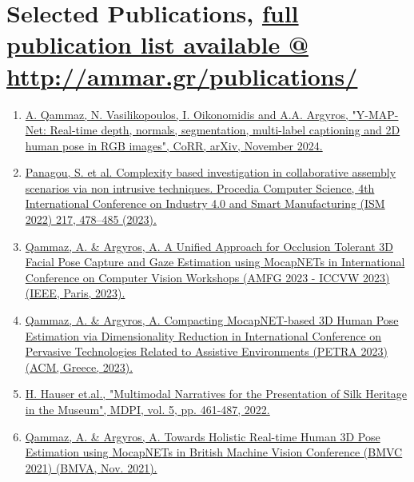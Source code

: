 \documentclass[a4,8pt]{article}
\begin{document}
\section{Selected Publications, \href{http://ammar.gr/publications/}{full publication list available @ http://ammar.gr/publications/} } 
\linespread{0.6} 
\begin{enumerate}[itemsep=-1mm]

  \item \href{http://users.ics.forth.gr/~argyros/mypapers/2024_11_arxiv_YMapNet_Qammaz.pdf}{A. Qammaz, N. Vasilikopoulos, I. Oikonomidis and A.A. Argyros, "Y-MAP-Net: Real-time depth, normals, segmentation, multi-label captioning and 2D human pose in RGB images", CoRR, arXiv, November 2024.}

  \item \href{http://users.ics.forth.gr/~argyros/mypapers/2022_11_ISM_Panagou.pdf}{Panagou, S. et al. Complexity based investigation in collaborative assembly scenarios via non intrusive techniques. Procedia Computer Science, 4th International Conference on Industry 4.0 and Smart Manufacturing (ISM 2022) 217, 478–485 (2023).}
  
  \item \href{http://users.ics.forth.gr/~argyros/mypapers/2023_10_AMFG_Qammaz.pdf}{Qammaz, A. \& Argyros, A. A Unified Approach for Occlusion Tolerant 3D Facial Pose Capture and Gaze Estimation using MocapNETs in International Conference on Computer Vision Workshops (AMFG 2023 - ICCVW 2023) (IEEE, Paris, 2023).}
  
  \item \href{http://users.ics.forth.gr/~argyros/mypapers/2023_07_PETRA_Qammaz.pdf}{Qammaz, A. \& Argyros, A. Compacting MocapNET-based 3D Human Pose Estimation via Dimensionality Reduction in International Conference on Pervasive Technologies Related to Assistive Environments (PETRA 2023) (ACM, Greece, 2023).}

  \item \href{http://users.ics.forth.gr/~argyros/mypapers/2022_journal_mingei.pdf}{H. Hauser et.al., "Multimodal Narratives for the Presentation of Silk Heritage in the Museum", MDPI, vol. 5, pp. 461-487, 2022.}
  
  \item \href{http://users.ics.forth.gr/~argyros/mypapers/2021_11_BMVC_Qammaz.pdf}{Qammaz, A. \& Argyros, A. Towards Holistic Real-time Human 3D Pose Estimation using MocapNETs in British Machine Vision Conference (BMVC 2021) (BMVA, Nov. 2021).}
  

\end{enumerate}
\end{document}
